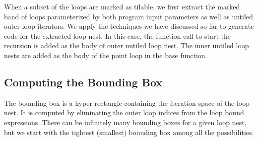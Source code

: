 When a subset of the loops are marked as tilable, we first extract the marked
band of loops parameterized by both program input parameters as well
as untiled outer loop iterators. We apply the techniques we have discussed so
far to generate code for the extracted loop nest. In this case, the function
call to start the recursion is added as the body of outer untiled loop nest.
The inner untiled loop nests are added as the body of the point loop in the
base function.


%

\subsection{Computing the Bounding Box}
\label{sec:computingBB}
The bounding box is a hyper-rectangle containing the iteration space of the
loop nest. It is computed by eliminating the outer loop indices from the loop
bound expressions.  There can be infinitely many bounding boxes for a given
loop nest, but we start with the tightest (smallest) bounding box among all
the possibilities.

